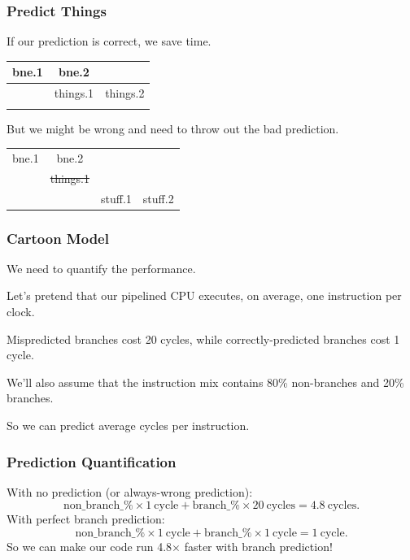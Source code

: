 \begin{frame}
\frametitle{Predict Things}
If our prediction is correct, we save time.

\begin{center}
\begin{tabular}{c|c|c}
bne.1 & bne.2 \\ \hline
& things.1 & things.2 \\
\\
\end{tabular}
\end{center}

But we might be wrong and need to throw out the bad prediction.

\begin{center}
\begin{tabular}{c|c|c|c}
bne.1 & bne.2 \\ \cline{1-2}
& \sout{things.1} \\ \hline
& & stuff.1 & stuff.2
\end{tabular}
\end{center}


\end{frame}



\begin{frame}
\frametitle{Cartoon Model}

We need to quantify the performance.


Let's pretend that our pipelined
CPU executes, on average, one instruction per clock.

Mispredicted branches cost 20 cycles, while correctly-predicted
branches cost 1 cycle. 

We'll also assume that the instruction
mix contains 80\% non-branches and 20\% branches. 

So we can predict
average cycles per instruction.


\end{frame}

\begin{frame}
\frametitle{Prediction Quantification}

With no prediction (or always-wrong prediction):
\[
\mathrm{non\_branch\_\%} \times 1 \mathrm{~cycle} + \mathrm{branch\_\%} \times 20 \mathrm{~cycles} = 4.8 \mathrm{~cycles}.
\]
With perfect branch prediction:
\[
\mathrm{non\_branch\_\%} \times 1 \mathrm{~cycle} + \mathrm{branch\_\%} \times 1 \mathrm{~cycle} = 1 \mathrm{~cycle}.
\]
So we can make our code run 4.8$\times$ faster with branch prediction!

\end{frame}



